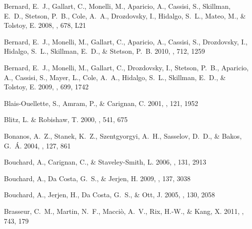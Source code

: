 \documentclass[manuscript]{aastex}
\begin{document}
\begin{thebibliography}{381}
{Bernard}, E.~J., {Gallart}, C., {Monelli}, M., {Aparicio}, A., {Cassisi}, S.,
  {Skillman}, E.~D., {Stetson}, P.~B., {Cole}, A.~A., {Drozdovsky}, I.,
  {Hidalgo}, S.~L., {Mateo}, M., \& {Tolstoy}, E. 2008, \apjl, 678, L21

{Bernard}, E.~J., {Monelli}, M., {Gallart}, C., {Aparicio}, A., {Cassisi}, S.,
  {Drozdovsky}, I., {Hidalgo}, S.~L., {Skillman}, E.~D., \& {Stetson}, P.~B.
  2010, \apj, 712, 1259

{Bernard}, E.~J., {Monelli}, M., {Gallart}, C., {Drozdovsky}, I., {Stetson},
  P.~B., {Aparicio}, A., {Cassisi}, S., {Mayer}, L., {Cole}, A.~A., {Hidalgo},
  S.~L., {Skillman}, E.~D., \& {Tolstoy}, E. 2009, \apj, 699, 1742

{Blais-Ouellette}, S., {Amram}, P., \& {Carignan}, C. 2001, \aj, 121, 1952

{Blitz}, L. \& {Robishaw}, T. 2000, \apj, 541, 675

{Bonanos}, A.~Z., {Stanek}, K.~Z., {Szentgyorgyi}, A.~H., {Sasselov}, D.~D., \&
  {Bakos}, G.~{\'A}. 2004, \aj, 127, 861

{Bouchard}, A., {Carignan}, C., \& {Staveley-Smith}, L. 2006, \aj, 131, 2913

{Bouchard}, A., {Da Costa}, G.~S., \& {Jerjen}, H. 2009, \aj, 137, 3038

{Bouchard}, A., {Jerjen}, H., {Da Costa}, G.~S., \& {Ott}, J. 2005, \aj, 130,
  2058

{Brasseur}, C.~M., {Martin}, N.~F., {Macci{\`o}}, A.~V., {Rix}, H.-W., \&
  {Kang}, X. 2011{}, \apj, 743, 179


\end{thebibliography}
\end{document}
